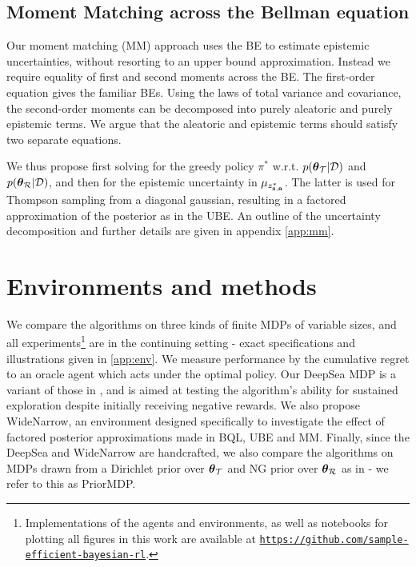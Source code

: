 \documentclass{article}
\begin{document}
\subsection{Moment Matching across the Bellman equation}

Our moment matching (MM) approach uses the BE to estimate epistemic uncertainties, without resorting to an upper bound approximation. Instead we require equality of first and second moments across the BE. The first-order equation gives the familiar BEs. Using the laws of total variance and covariance, the second-order moments can be decomposed into purely aleatoric and purely epistemic terms. We argue that the aleatoric and epistemic terms should satisfy two separate equations.

We thus propose first solving for the greedy policy $\pi^*$ w.r.t. $p(\boldsymbol{\theta}_{\mathcal{T}} | \mathcal{D})$ and $p(\boldsymbol{\theta}_{\mathcal{R}} | \mathcal{D})$, and then for the epistemic uncertainty in $\mu_{z^*_{\mathbf{s}, \mathbf{a}}}$. The latter is used for Thompson sampling from a diagonal gaussian, resulting in a factored approximation of the posterior as in the UBE. An outline of the uncertainty decomposition and further details are given in appendix \ref{app:mm}.

\section{Environments and methods}

We compare the algorithms on three kinds of finite MDPs of variable sizes, and all experiments\footnote{Implementations of the agents and environments, as well as notebooks for plotting all figures in this work are available at \texttt{\href{https://github.com/sample-efficient-bayesian-rl/nips-2019-rl-workshop}{https://github.com/sample-efficient-bayesian-rl}}.} are in the continuing setting - exact specifications and illustrations given in \cref{app:env}. We measure performance by the cumulative regret to an oracle agent which acts under the optimal policy. Our DeepSea MDP is a variant of those in \cite{rand_val_func, deepsea}, and is aimed at testing the algorithm's ability for sustained exploration despite initially receiving negative rewards. We also propose WideNarrow, an environment designed specifically to investigate the effect of factored posterior approximations made in BQL, UBE and MM. Finally, since the DeepSea and WideNarrow are handcrafted, we also compare the algorithms on MDPs drawn from a Dirichlet prior over $\boldsymbol{\theta}_{\mathcal{T}}$ and NG prior over $\boldsymbol{\theta}_{\mathcal{R}}$ as in \cite{psrl} - we refer to this as PriorMDP.
\end{document}
